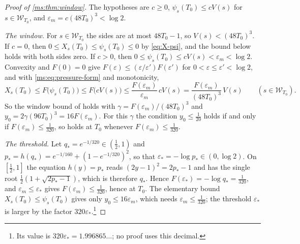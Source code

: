 \documentclass[11pt,a4paper]{amsart}
\theoremstyle{definition}
\theoremstyle{remark}
\numberwithin{equation}{section}
\newcommand{\Wwin}{\mathcal{W}}      %
\newcommand{\TT}{\mathbb{T}}               %
\newcommand{\Zc}{\mathcal{Z}}              %
\newcommand{\XT}[2]{X_{#1}(#2)}            %
\newcommand{\psiT}[2]{\psi_{#1}(#2)}       %
\newcommand{\Vol}[1]{V(#1)}                %
\newcommand{\Bstar}{\text{\upshape(B$^{*}$)}}       %
\begin{document}
\begin{proof}[Proof of \cref{ms:thm:window}]
The hypotheses are $c\ge0$, $\psiT{s}{T_0}\le c\Vol{s}$ for $s\in\Wwin_{T_0}$, and $\varepsilon_m=c(48T_0)^3<\log2$.

\emph{The window.} For $s\in\Wwin_{T_0}$ the sides are at most $48T_0-1$, so $\Vol{s}<(48T_0)^3$. If $c=0$, then $0\le\XT{s}{T_0}\le\psiT{s}{T_0}\le0$ by \eqref{eq:X-psi}, and the bound below holds with both sides zero. If $c>0$, then $0\le\psiT{s}{T_0}\le c\Vol{s}<\varepsilon_m<\log2$. Convexity and $F(0)=0$ give $F(\varepsilon)\le(\varepsilon/\varepsilon')F(\varepsilon')$ for $0<\varepsilon\le\varepsilon'<\log2$, and with \eqref{ms:eq:pressure-form} and monotonicity,
\[
\XT{s}{T_0}\le F\bigl(\psiT{s}{T_0}\bigr)\le F\bigl(c\Vol{s}\bigr)\le\frac{F(\varepsilon_m)}{\varepsilon_m}\,c\Vol{s}=\frac{F(\varepsilon_m)}{(48T_0)^3}\,\Vol{s}\qquad(s\in\Wwin_{T_0}).
\]
So the window bound of \Bstar{} holds with $\gamma=F(\varepsilon_m)/(48T_0)^3$ and $y_0=2\gamma(96T_0)^3=16F(\varepsilon_m)$. For this $\gamma$ the condition $y_0\le\frac1{20}$ holds if and only if $F(\varepsilon_m)\le\frac1{320}$, so \Bstar{} holds at $T_0$ whenever $F(\varepsilon_m)\le\frac1{320}$.

\emph{The threshold.} Let $q_*=e^{-1/320}\in(\frac12,1)$ and $p_*=h(q_*)=e^{-1/160}+(1-e^{-1/320})^2$, so that $\varepsilon_*=-\log p_*\in(0,\log2)$. On $[\frac12,1]$ the equation $h(y)=p_*$ reads $(2y-1)^2=2p_*-1$ and has the single root $\frac12(1+\sqrt{2p_*-1})$, which is therefore $q_*$. Hence $F(\varepsilon_*)=-\log q_*=\frac1{320}$, and $\varepsilon_m\le\varepsilon_*$ gives $F(\varepsilon_m)\le\frac1{320}$, hence \Bstar{} at $T_0$. The elementary bound $\XT{s}{T_0}\le\psiT{s}{T_0}$ gives only $y_0\le16\varepsilon_m$, which needs $\varepsilon_m\le\frac1{320}$; the threshold $\varepsilon_*$ is larger by the factor $320\varepsilon_*$.\footnote{Its value is $320\varepsilon_*=1.996865\ldots$; no proof uses this decimal.}
\end{proof}
\end{document}
